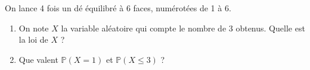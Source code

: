 \documentclass[11pt,fleqn, openany]{book} %
\begin{document}
%
%
%




\begin{exercise}[topic=prob12]On lance 4 fois un dé équilibré à 6 faces, numérotées de 1 à 6. 
\begin{enumerate}
\item On note $X$ la variable aléatoire qui compte le nombre de 3 obtenus. Quelle est la loi de $X$ ?
\item Que valent $\mathbb{P}(X=1)$ et $\mathbb{P}(X \leqslant 3)$ ?
\end{enumerate} \newpage \end{exercise}
\end{document}
